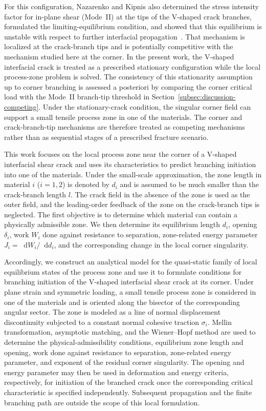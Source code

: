 \documentclass[pdflatex,onecolumn,sn-mathphys-ay]{sn-jnl}
\newcommand{\dd}{\mathop{}\!\mathrm{d}}
\begin{document}
For this configuration, Nazarenko and Kipnis also determined the stress
intensity factor for in-plane shear (Mode~II) at the tips of the
V-shaped crack branches, formulated the limiting-equilibrium condition, and showed
that this equilibrium is unstable with respect to further interfacial
propagation~\citeyearpar{NazarenkoKipnis2022Equilibrium}. That mechanism is localized
at the crack-branch tips and is potentially competitive with the mechanism studied
here at the corner. In the present work, the V-shaped interfacial crack is
treated as a prescribed stationary configuration while the local process-zone
problem is solved. The consistency of this stationarity assumption up to
corner branching is assessed a posteriori by comparing the corner critical
load with the Mode~II branch-tip threshold in
Section~\ref{subsec:discussion-competing}. Under the stationary-crack
condition, the singular corner field can support a small tensile process
zone in one of the materials. The corner and crack-branch-tip mechanisms are
therefore treated as competing mechanisms rather than as sequential stages
of a prescribed fracture scenario.

This work focuses on the local process zone near the corner of a V-shaped
interfacial shear crack and uses its characteristics to predict branching
initiation into one of the materials. Under the small-scale
approximation, the zone length in material $i$ ($i=1,2$) is denoted by $d_i$
and is assumed to be much smaller than the crack-branch length $l$. The crack field in the absence of the zone is used as the outer field, and
the leading-order feedback of the zone on the crack-branch tips is neglected.
The first objective is to determine which material can contain a physically
admissible zone. We then determine its equilibrium length $d_i$, opening
$\delta_i$, work $W_i$ done against resistance to separation, zone-related
energy parameter $J_i=\dd W_i/\dd d_i$, and the corresponding change in the
local corner singularity.

Accordingly, we construct an analytical model for the quasi-static family of
local equilibrium states of the process zone and use it to formulate
conditions for branching initiation of the V-shaped interfacial shear crack
at its corner. Under plane strain and symmetric loading, a small tensile
process zone is considered in one of the materials and is oriented along the
bisector of the corresponding angular sector. The zone is modeled as a line
of normal displacement discontinuity subjected to a constant normal cohesive
traction $\sigma_i$. Mellin transformation, asymptotic matching, and the Wiener--Hopf method are
used to determine the physical-admissibility conditions, equilibrium zone
length and opening, work done against resistance to separation, zone-related
energy parameter, and exponent of the residual corner singularity. The opening
and energy parameter may then be used in deformation and energy criteria,
respectively, for initiation of the branched crack once the corresponding
critical characteristic is specified independently. Subsequent propagation and the finite branching path
are outside the scope of this local formulation.
\end{document}
